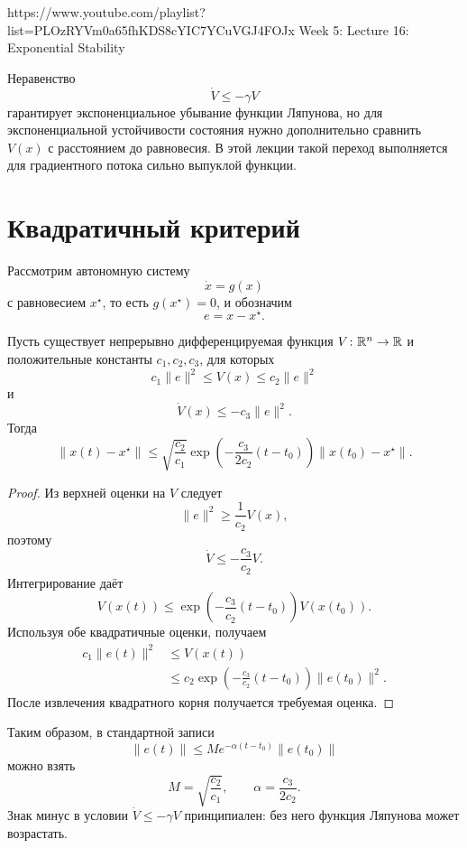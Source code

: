 
\sourcevideo
    {https://www.youtube.com/playlist?list=PLOzRYVm0a65fhKDS8cYIC7YCuVGJ4FOJx}
    {Week 5: Lecture 16: Exponential Stability}

Неравенство
\[
    \dot V\le-\gamma V
\]
гарантирует экспоненциальное убывание функции Ляпунова, но для
экспоненциальной устойчивости состояния нужно дополнительно сравнить
\(V(x)\) с расстоянием до равновесия. В этой лекции такой переход
выполняется для градиентного потока сильно выпуклой функции.

\section{Квадратичный критерий}

Рассмотрим автономную систему
\[
    \dot x=g(x)
\]
с равновесием \(x^\star\), то есть \(g(x^\star)=0\), и обозначим
\[
    e=x-x^\star.
\]

\begin{theorem}
Пусть существует непрерывно дифференцируемая функция
\(V\colon\mathbb{R}^n\to\mathbb{R}\) и положительные константы
\(c_1,c_2,c_3\), для которых
\[
    c_1\lVert e\rVert^2
    \le
    V(x)
    \le
    c_2\lVert e\rVert^2
\]
и
\[
    \dot V(x)
    \le
    -c_3\lVert e\rVert^2.
\]
Тогда
\[
    \lVert x(t)-x^\star\rVert
    \le
    \sqrt{\frac{c_2}{c_1}}
    \exp\left(
        -\frac{c_3}{2c_2}(t-t_0)
    \right)
    \lVert x(t_0)-x^\star\rVert.
\]
\end{theorem}

\begin{proof}
Из верхней оценки на \(V\) следует
\[
    \lVert e\rVert^2\ge\frac1{c_2}V(x),
\]
поэтому
\[
    \dot V\le-\frac{c_3}{c_2}V.
\]
Интегрирование даёт
\[
    V(x(t))
    \le
    \exp\left(
        -\frac{c_3}{c_2}(t-t_0)
    \right)
    V(x(t_0)).
\]
Используя обе квадратичные оценки, получаем
\[
\begin{aligned}
    c_1\lVert e(t)\rVert^2
    &\le
    V(x(t))
    \\
    &\le
    c_2
    \exp\left(
        -\frac{c_3}{c_2}(t-t_0)
    \right)
    \lVert e(t_0)\rVert^2.
\end{aligned}
\]
После извлечения квадратного корня получается требуемая оценка.
\end{proof}

Таким образом, в стандартной записи
\[
    \lVert e(t)\rVert
    \le
    M e^{-\alpha(t-t_0)}\lVert e(t_0)\rVert
\]
можно взять
\[
    M=\sqrt{\frac{c_2}{c_1}},
    \qquad
    \alpha=\frac{c_3}{2c_2}.
\]
Знак минус в условии \(\dot V\le-\gamma V\) принципиален: без него
функция Ляпунова может возрастать.

